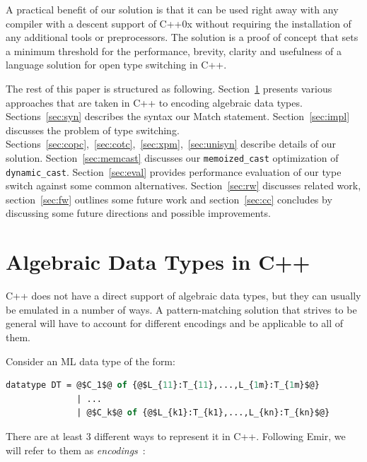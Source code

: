\documentclass[preprint]{sigplanconf}
\makeatletter
\DeclareRobustCommand{\code}[1]{{\lstinline[breaklines=false,escapechar=@]{#1}}}
\makeatother
\begin{document}
A practical benefit of our solution is that it can be used right away with any 
compiler with a descent support of C++0x without requiring the installation of 
any additional tools or preprocessors. The solution is a proof of concept that 
sets a minimum threshold for the performance, brevity, clarity and usefulness of 
a language solution for open type switching in C++.

The rest of this paper is structured as following. Section~\ref{sec:adt} 
presents various approaches that are taken in C++ to encoding algebraic data 
types. Sections~\ref{sec:syn} describes the syntax our Match statement. 
Section~\ref{sec:impl} discusses the problem of type switching. 
Sections~\ref{sec:copc},~\ref{sec:cotc},~\ref{sec:xpm},~\ref{sec:unisyn} 
describe details of our solution. Section~\ref{sec:memcast} discusses our 
\code{memoized_cast} optimization of \code{dynamic_cast}. Section~\ref{sec:eval}
provides performance evaluation of our type switch against some common alternatives. 
Section~\ref{sec:rw} discusses related work, section~\ref{sec:fw} outlines some 
future work and section~\ref{sec:cc} concludes by discussing some future 
directions and possible improvements.


\section{Algebraic Data Types in C++}
\label{sec:adt}

C++ does not have a direct support of algebraic data types, but they can usually 
be emulated in a number of ways. A pattern-matching solution that strives to be 
general will have to account for different encodings and be applicable to all of 
them.

Consider an ML data type of the form:

\begin{lstlisting}[language=ML,keepspaces,columns=flexible,escapechar=@]
datatype DT = @$C_1$@ of {@$L_{11}:T_{11},...,L_{1m}:T_{1m}$@} 
              | ...
              | @$C_k$@ of {@$L_{k1}:T_{k1},...,L_{kn}:T_{kn}$@}
\end{lstlisting}

\noindent There are at least 3 different ways to represent it in C++. Following 
Emir, we will refer to them as \emph{encodings}~\cite{EmirThesis}:
\end{document}
